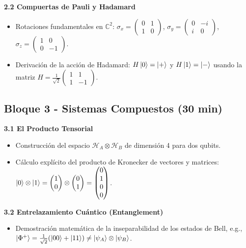 \documentclass[12pt, a4paper]{article}
\begin{document}
\textbf{2.2 Compuertas de Pauli y Hadamard}
\begin{itemize}
    \item Rotaciones fundamentales en $\mathbb{C}^2$: 
    $\sigma_x = \begin{pmatrix} 0 & 1 \\ 1 & 0 \end{pmatrix}$, $\sigma_y = \begin{pmatrix} 0 & -i \\ i & 0 \end{pmatrix}$, $\sigma_z = \begin{pmatrix} 1 & 0 \\ 0 & -1 \end{pmatrix}$.
    \item Derivación de la acción de Hadamard: $H\ket{0} = \ket{+}$ y $H\ket{1} = \ket{-}$ usando la matriz $H = \frac{1}{\sqrt{2}}\begin{pmatrix} 1 & 1 \\ 1 & -1 \end{pmatrix}$.
\end{itemize}

\subsection*{Bloque 3 - Sistemas Compuestos (30 min)}
\textbf{3.1 El Producto Tensorial}
\begin{itemize}
    \item Construcción del espacio $\mathcal{H}_A \otimes \mathcal{H}_B$ de dimensión 4 para dos qubits.
    \item Cálculo explícito del producto de Kronecker de vectores y matrices: $\ket{0} \otimes \ket{1} = \begin{pmatrix} 1 \\ 0 \end{pmatrix} \otimes \begin{pmatrix} 0 \\ 1 \end{pmatrix} = \begin{pmatrix} 0 \\ 1 \\ 0 \\ 0 \end{pmatrix}$.
\end{itemize}

\textbf{3.2 Entrelazamiento Cuántico (Entanglement)}
\begin{itemize}
    \item Demostración matemática de la inseparabilidad de los estados de Bell, e.g., $\ket{\Phi^+} = \frac{1}{\sqrt{2}}(\ket{00} + \ket{11}) \neq \ket{\psi_A} \otimes \ket{\psi_B}$.
\end{itemize}
\end{document}

